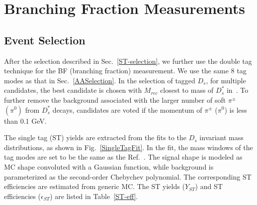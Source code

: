 \section{Branching Fraction Measurements}
\label{BFM}
\subsection{Event Selection}
\label{BFSelection}
After the selection described in Sec.~\ref{ST-selection}, we further use the double tag technique for the BF (branching fraction) measurement. 
We use the same 8 tag modes as that in Sec.~\ref{AASelection}.
In the selection of tagged $D_{s}$, for multiple candidates, the best candidate is chosen with $M_{rec}$ closest to mass of $D_{s}^{*}$ in~\cite{PDG2018}.
To further remove the background associated with the larger number of soft $\pi^{\pm}$ $(\pi^{0})$ from $D_{s}^{*}$ decays, candidates are voted if the momentum of $\pi^{\pm}$ ($\pi^{0}$) is less than 0.1 GeV.

The single tag (ST) yields are extracted from the fits to the $D_{s}$ invariant mass distributions, as shown in Fig.~\ref{SingleTagFit}. 
In the fit, the mass windows of the tag modes are set to be the same as the Ref.~\cite{Doc-DB-630-v35}.
The signal shape is modeled as MC shape convoluted with a Gaussian function, while background is parameterized as the second-order Chebychev polynomial.
The corresponding ST efficiencies are estimated from generic MC. The ST yields ($Y_{ST}$) and ST efficiencies ($\epsilon_{ST}$) are listed in Table~\ref{ST-eff}.

